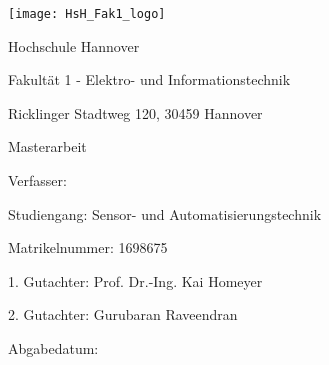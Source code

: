\begin{titlepage}           
    \begin{center}
        \texttt{[image: HsH\_Fak1\_logo]}
        \par
        \vspace{1cm}
        {\Large Hochschule Hannover \par}
        {\Large Fakultät 1 - Elektro- und Informationstechnik \par}
        Ricklinger Stadtweg 120, 30459 Hannover \par
        \vspace{1cm}
        {\Large Masterarbeit\par}
        \vspace{1cm}
        {\huge\bfseries \thetitle\par}
        \vspace{1.5cm}
        {\Large Verfasser: \theauthor\par}
        Studiengang: Sensor- und Automatisierungstechnik \par 
        Matrikelnummer: 1698675 
        \vspace{1cm}
    \end{center}
    \begin{flushleft}
        1. Gutachter: Prof. Dr.-Ing. Kai Homeyer \par
        2. Gutachter: Gurubaran Raveendran \par
        Abgabedatum: \thedate
    \end{flushleft}
    
\end{titlepage}